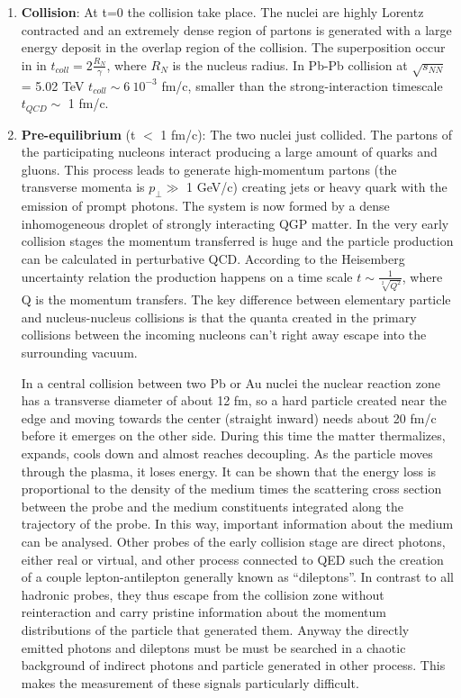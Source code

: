 \documentclass[12pt,a4paper]{book}
\begin{document}
	\begin{enumerate}
		\item \textbf{Collision}: At t=0 the collision take place. The nuclei are highly Lorentz contracted and an extremely dense region of partons is generated with a large energy deposit in the overlap region of the collision. The superposition occur in in $t_{coll} = 2 \frac{R_N}{\gamma}$, where $R_N$ is the nucleus radius. In Pb-Pb collision at $\sqrt{s_{NN}}$ = 5.02 TeV $t_{coll} \sim 6 \ 10^{-3}$ fm/c, smaller than the strong-interaction timescale $t_{QCD}\sim$ 1 fm/c. 
		\item \textbf{Pre-equilibrium} (t $<$ 1 fm/c): The two nuclei just collided. The partons of the participating nucleons interact producing a large amount of quarks and gluons. This process leads to generate high-momentum partons (the transverse momenta is $p_\perp \gg$ 1 GeV/c) creating jets or heavy quark with the emission of prompt photons. The system is now formed by a dense inhomogeneous droplet of strongly interacting QGP matter. In the very early collision stages the momentum transferred is huge and the particle production can be calculated in perturbative QCD. According to the Heisemberg uncertainty relation the production happens on a time scale $t \sim \frac{1}{\sqrt[2]{Q^2}}$, where Q is the momentum transfers. The key difference between elementary particle and nucleus-nucleus collisions is that the quanta created in the primary collisions between the incoming nucleons can’t right away escape into the surrounding vacuum. 
		
		In a central collision between two Pb or Au nuclei the nuclear reaction zone has a transverse diameter of about 12 fm, so a hard particle created near the edge and moving towards the center (straight inward) needs about 20 fm/c before it emerges on the other side. During this time the matter thermalizes, expands, cools down and almost reaches decoupling. As the particle moves through the plasma, it loses energy. It can be shown that the energy loss is proportional to the density of the medium times the scattering cross section between the probe and the medium constituents integrated along the trajectory of the probe. In this way, important information about the medium can be analysed. Other probes of the early collision stage are direct photons, either real or virtual, and other process connected to QED such the creation of a couple lepton-antilepton generally known as “dileptons”.  In contrast to all hadronic probes, they thus escape from the collision zone without reinteraction and carry pristine information about the momentum distributions of the particle that generated them. Anyway the directly emitted photons and dileptons must be must be searched in a chaotic background of indirect photons and particle generated in other process. This makes the measurement of these signals particularly difficult. 
		

\end{enumerate}
\end{document}
